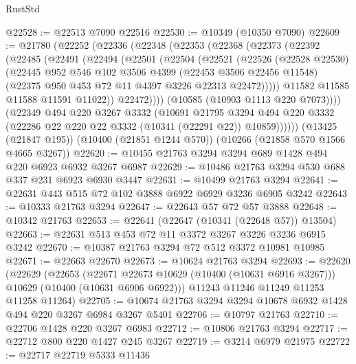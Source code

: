 \begin{lexlean}{RustStd}
\begin{coremodule}
@22528 := @22513 @7090 @22516
@22530 := @10349 (@10350 @7090)
@22609 := @21780
    (@22252
      (@22336
        (@22348
          (@22353
            (@22368
              (@22373
                (@22392
                  (@22485
                    (@22491
                      (@22494
                        (@22501
                          (@22504
                            (@22521
                              (@22526
                                (@22528 @22530)
                                (@22445
                                  @952
                                  @546
                                  @102
                                  @3506
                                  @4399
                                  (@22453 @3506 @22456 @11548)
                                  (@22375 @950 @453 @72 @11 @4397 @3226 @22313 @22472)))))
                          @11582
                          @11585
                          @11588
                          @11591
                          @11022))
                      @22472))))
              (@10585 (@10903 @1113 @220 @7073))))
          (@22349
            @494
            @220
            @3267
            @3332
            (@10691
              @21795
              @3294
              @494
              @220
              @3332
              (@22286 @22 @220 @22 @3332 (@10341 (@22291 @22)) @10859))))))
    (@13425 (@21847 @195))
    (@10400 (@21851 @1244 @570))
    (@10266 (@21858 @570 @1566 @4665 @3267))
@22620 := @10455 @21763 @3294 @3294 @689 @1428 @494 @220 @6923 @6932 @3267 @6987
@22629 := @10486 @21763 @3294 @530 @688 @337 @231 @6923 @6930 @3447
@22631 := @10499 @21763 @3294
@22641 := @22631 @443 @515 @72 @102 @3888 @6922 @6929 @3236 @6905 @3242
@22643 := @10333 @21763 @3294
@22647 := @22643 @57 @72 @57 @3888
@22648 := @10342 @21763
@22653 := @22641 (@22647 (@10341 (@22648 @57)) @13504)
@22663 := @22631 @513 @453 @72 @11 @3372 @3267 @3226 @3236 @6915 @3242
@22670 := @10387 @21763 @3294 @72 @512 @3372 @10981 @10985
@22671 := @22663 @22670
@22673 := @10624 @21763 @3294
@22693 := @22620
    (@22629
      (@22653
        (@22671 @22673 @10629 (@10400 (@10631 @6916 @3267)))
        @10629
        (@10400 (@10631 @6906 @6922)))
      @11243
      @11246
      @11249
      @11253
      @11258
      @11264)
@22705 := @10674 @21763 @3294 @3294 @10678 @6932 @1428 @494 @220 @3267 @6984 @3267 @5401
@22706 := @10797 @21763
@22710 := @22706 @1428 @220 @3267 @6983
@22712 := @10806 @21763 @3294
@22717 := @22712 @800 @220 @1427 @245 @3267
@22719 := @3214 @6979 @21975
@22722 := @22717 @22719 @5333 @11436

\end{coremodule}
\end{lexlean}
